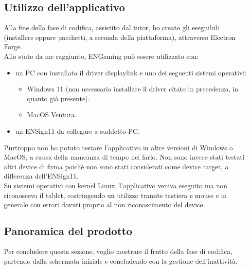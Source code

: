 \newpage
\subsection{Utilizzo dell'applicativo}
Alla fine della fase di codifica, assistito dal tutor, ho creato gli eseguibili (installers oppure pacchetti, a seconda della piattaforma), attraverso Electron Forge.\\
Allo stato da me raggiunto, ENGaming può essere utilizzato con:
\begin{itemize}
    \item un PC con installato il driver \gls{displaylink} e uno dei seguenti sistemi operativi: \begin{itemize}
    \item Windows 11 (non necessario installare il driver citato in precedenza, in quanto già presente).
    \item MacOS Ventura.
    \end{itemize}
    \item un ENSign11 da collegare a suddetto PC.
\end{itemize}
Purtroppo non ho potuto testare l'applicativo in altre versioni di Windows o MacOS, a causa della mancanza di tempo nel farlo. Non sono invece stati testati altri device di firma poichè non sono stati considerati come device target, a differenza dell'ENSign11.\\
Su sistemi operativi con kernel Linux, l'applicativo veniva eseguito ma non riconosceva il tablet, costringendo un utilizzo tramite tastiera e mouse e in generale con errori dovuti proprio al non riconoscimento del device.
\newpage
\subsection{Panoramica del prodotto}
Per concludere questa sezione, voglio mostrare il frutto della fase di codifica, partendo dalla schermata iniziale e concludendo con la gestione dell'inattività.\\
